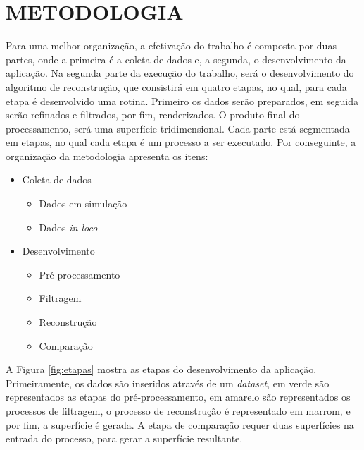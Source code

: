 
\chapter{METODOLOGIA}
\label{chap:metodologia}

Para uma melhor organização, a efetivação do trabalho é composta por duas partes, onde a primeira é a coleta de dados e, a segunda, o desenvolvimento da aplicação. 
Na segunda parte da execução do trabalho, será o desenvolvimento do algoritmo de reconstrução, que consistirá em quatro etapas, no qual, para cada etapa é desenvolvido uma rotina. 
Primeiro os dados serão preparados, em seguida serão refinados e filtrados, por fim, renderizados.
O produto final do processamento, será uma superfície tridimensional.
Cada parte está segmentada em etapas, no qual cada etapa é um processo a ser executado. Por conseguinte, a organização da metodologia apresenta os itens:

\begin{itemize}
    \addtolength{\itemindent}{2em}
    
    \item Coleta de dados
    \begin{itemize}
        \addtolength{\itemindent}{2em}
        
        \item Dados em simulação
        \item Dados \textit{in loco}
    \end{itemize}
    
    \item Desenvolvimento
    \begin{itemize}
        \addtolength{\itemindent}{2em}
        
        \item Pré-processamento
        \item Filtragem
        \item Reconstrução
        \item Comparação
    \end{itemize}
\end{itemize}
\hspace{1em}

A Figura \ref{fig:etapas} mostra as etapas do desenvolvimento da aplicação. Primeiramente, os dados são inseridos através de um \textit{dataset}, em verde são representados as etapas do pré-processamento, em amarelo são representados os processos de filtragem, o processo de reconstrução é representado em marrom, e por fim, a superfície é gerada.
A etapa de comparação requer duas superfícies na entrada do processo, para gerar a superfície resultante.


